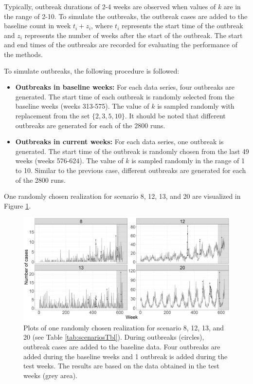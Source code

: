 \documentclass[preprint, 3p, authoryear]{elsarticle} %
\begin{document}
Typically, outbreak durations of 2-4 weeks are observed when values of \(k\) are in the range of 2-10. To simulate the outbreaks, the outbreak cases are added to the baseline count in week \(t_i+z_i\), where \(t_i\) represents the start time of the outbreak and \(z_i\) represents the number of weeks after the start of the outbreak. The start and end times of the outbreaks are recorded for evaluating the performance of the methods.

To simulate outbreaks, the following procedure is followed:

\begin{itemize} 
\item \textbf{Outbreaks in baseline weeks:} For each data series, four outbreaks are generated. The start time of each outbreak is randomly selected from the baseline weeks (weeks 313-575). The value of $k$ is sampled randomly with replacement from the set $\{2, 3, 5, 10\}$. It should be noted that different outbreaks are generated for each of the 2800 runs.
\item \textbf{Outbreaks in current weeks:} For each data series, one outbreak is generated. The start time of the outbreak is randomly chosen from the last 49 weeks (weeks 576-624). The value of $k$ is sampled randomly in the range of 1 to 10. Similar to the previous case, different outbreaks are generated for each of the 2800 runs.
\end{itemize}

One randomly chosen realization for scenario 8, 12, 13, and 20 are visualized in Figure \ref{fig:Realizations}.



\begin{figure}[H]
\includegraphics[width=1\linewidth]{../../figures/Realizations} \caption{Plots of one randomly chosen realization for scenario 8, 12, 13, and 20 (see Table \ref{tab:scenariosTbl}). During outbreaks (circles), outbreak cases are added to the baseline data. Four outbreaks are added during the baseline weeks and 1 outbreak is added during the test weeks. The results are based on the data obtained in the test weeks (grey area).}\label{fig:Realizations}
\end{figure}
\end{document}
